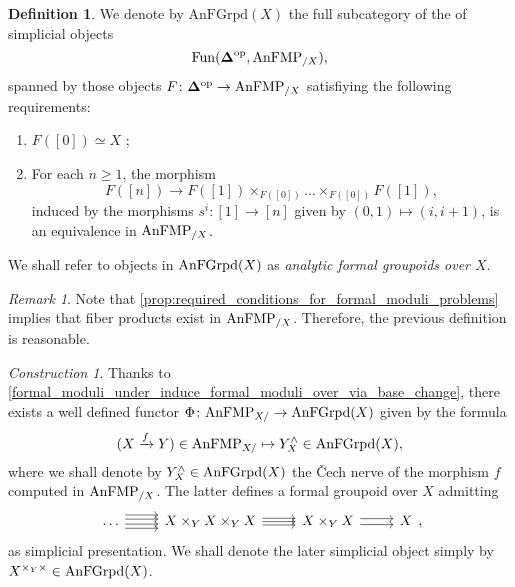 \documentclass[10pt,a4paper,reqno]{amsart} %
\theoremstyle{plain}
\theoremstyle{definition}
\newtheorem{defin}[thm]{Definition}
\theoremstyle{remark}
\newtheorem{rem}[thm]{Remark}
\numberwithin{equation}{section}
\newtheorem{construction}[thm]{Construction}
\begin{document}
\begin{defin}We denote by
    $\mathrm{AnFGrpd}(X)$ the full subcategory of the \infcat of simplicial objects
        \[
            \operatorname{Fun}( \bm{\Delta} ^\mathrm{op}, \mathrm{AnFMP}_{/X}),
        \]
    spanned by those objects $F \colon \mathbf \Delta ^\mathrm{op} \to \mathrm{AnFMP}_{/X}$ satisfiying the following requirements:
        \begin{enumerate}
            \item $F([0]) \simeq X$ ;
            \item For each $n \ge 1$, the morphism
                \[
                    F([n]) \to F([1]) \times_{F([0])} \dots \times_{F([0])} F([1])  ,
                \]
            induced by the morphisms $s^i \colon [1] \to [n]$ given by $(0,1) \mapsto (i, i+1)$, is an equivalence
            in $\mathrm{AnFMP}_{/X}$.
        \end{enumerate}
    We shall refer to objects in $\mathrm{AnFGrpd}(X)$ as \emph{analytic formal groupoids over $X$}.
\end{defin}

\begin{rem}
    Note that \cref{prop:required_conditions_for_formal_moduli_problems} implies that fiber products exist in $\mathrm{AnFMP}_{/X}$. Therefore, the previous
    definition is reasonable.
\end{rem}



\begin{construction} \label{const:formal_completion_construction_Phi} Thanks to \cref{formal_moduli_under_induce_formal_moduli_over_via_base_change},
there exists a well defined functor $\Phi \colon \mathrm{AnFMP}_{X/} \to \mathrm{AnFGrpd}(X)$ given by the formula
    \[
        (X \xrightarrow{f} Y ) \in \mathrm{AnFMP}_{X/ } \mapsto Y^\wedge_X \in \mathrm{AnFGrpd}(X),
    \]
where we shall denote by $Y^\wedge_X \in \mathrm{AnFGrpd}(X)$ the \v{C}ech nerve of the morphism $f$ computed in $\mathrm{AnFMP}_{/ X}$.
The latter defines a formal groupoid over $X$ admitting
    \[
    \begin{tikzcd}
      \dots \ar[r, shift left=2] \ar[r, shift left=0.75] 
      \ar[r, shift left=-0.75] \ar[r, shift left=-2]
      & X \times_Y X \times_Y X \ar[r, shift left=-1] \ar[r, shift left=1] \ar[r] 
      & X \times_Y X \ar[r, shift left=-0.5ex] \ar[r, shift left=0.5ex] 
      & X 
    \end{tikzcd},
    \] 
as simplicial presentation. We shall denote the later simplicial object simply by $X^{\times_Y \times} \in \mathrm{AnFGrpd}(X)$.
\end{construction}
\end{document}
